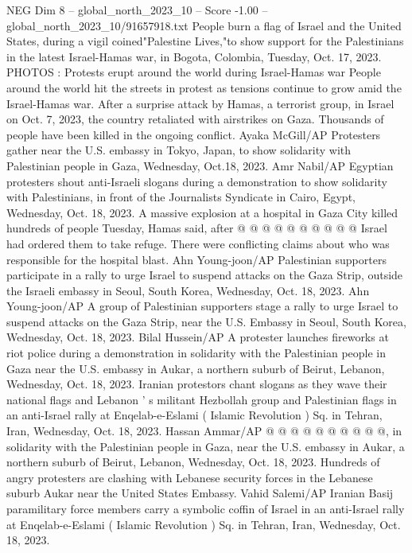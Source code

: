 \begin{textsample}{NEG Dim 8 – global\_north\_2023\_10 – Score -1.00 – global\_north\_2023\_10/91657918.txt}  \label{ex:f8_neg_238}
People burn a flag of Israel and the United States, during a vigil coined"Palestine Lives,"to show support for the Palestinians in the latest Israel-Hamas war, in Bogota, Colombia, Tuesday, Oct. 17, 2023.
PHOTOS : Protests erupt around the world during Israel-Hamas war People around the world hit the streets in protest as tensions continue to grow amid the Israel-Hamas war.
After a surprise attack by Hamas, a terrorist group, in Israel on Oct. 7, 2023, the country retaliated with airstrikes on Gaza.
Thousands of people have been killed in the ongoing conflict.
Ayaka McGill/AP Protesters gather near the U.S. embassy in Tokyo, Japan, to show solidarity with Palestinian people in Gaza, Wednesday, Oct.18, 2023.
Amr Nabil/AP Egyptian protesters shout anti-Israeli slogans during a demonstration to show solidarity with Palestinians, in front of the Journalists Syndicate in Cairo, Egypt, Wednesday, Oct. 18, 2023.
A massive explosion at a hospital in Gaza City killed hundreds of people Tuesday, Hamas said, after @ @ @ @ @ @ @ @ @ @ Israel had ordered them to take refuge.
There were conflicting claims about who was responsible for the hospital blast.
Ahn Young-joon/AP Palestinian supporters participate in a rally to urge Israel to suspend attacks on the Gaza Strip, outside the Israeli embassy in Seoul, South Korea, Wednesday, Oct. 18, 2023.
Ahn Young-joon/AP A group of Palestinian supporters stage a rally to urge Israel to suspend attacks on the Gaza Strip, near the U.S.
Embassy in Seoul, South Korea, Wednesday, Oct. 18, 2023.
Bilal Hussein/AP A protester launches fireworks at riot police during a demonstration in solidarity with the Palestinian people in Gaza near the U.S. embassy in Aukar, a northern suburb of Beirut, Lebanon, Wednesday, Oct. 18, 2023.
Iranian protestors chant slogans as they wave their national flags and Lebanon ' s militant Hezbollah group and Palestinian flags in an anti-Israel rally at Enqelab-e-Eslami ( Islamic Revolution ) Sq. in Tehran, Iran, Wednesday, Oct. 18, 2023.
Hassan Ammar/AP @ @ @ @ @ @ @ @ @ @, in solidarity with the Palestinian people in Gaza, near the U.S. embassy in Aukar, a northern suburb of Beirut, Lebanon, Wednesday, Oct. 18, 2023.
Hundreds of angry protesters are clashing with Lebanese security forces in the Lebanese suburb Aukar near the United States Embassy.
Vahid Salemi/AP Iranian Basij paramilitary force members carry a symbolic coffin of Israel in an anti-Israel rally at Enqelab-e-Eslami ( Islamic Revolution ) Sq. in Tehran, Iran, Wednesday, Oct. 18, 2023.

\end{textsample}
